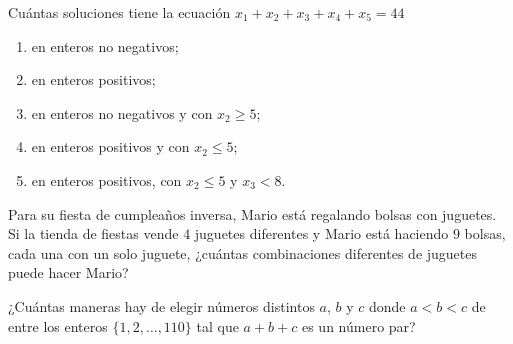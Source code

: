 \begin{problema}
Cuántas soluciones tiene la ecuación $\displaystyle x_1+x_2+x_3+x_4+x_5=44$
\begin{enumerate}
    \item en enteros no negativos;
    \item en enteros positivos;
    \item en enteros no negativos y con $x_2\geq 5$;
    \item en enteros positivos y con $x_2\leq 5$;
    \item en enteros positivos, con $x_2\leq 5$ y $x_3<8$.
\end{enumerate}
\end{problema}
\begin{problema}
Para su fiesta de cumpleaños inversa, Mario está regalando bolsas con juguetes. Si la tienda de fiestas vende $4$ juguetes diferentes y Mario está haciendo $9$ bolsas, cada una con un solo juguete, ¿cuántas combinaciones diferentes de juguetes puede hacer Mario?
\end{problema}

\begin{problema}
¿Cuántas maneras hay de elegir números distintos $a$, $b$ y $c$ donde $a < b < c$ de entre los enteros $\{1, 2, \ldots, 110\}$ tal que $a+b+c$ es un número par?
\end{problema}